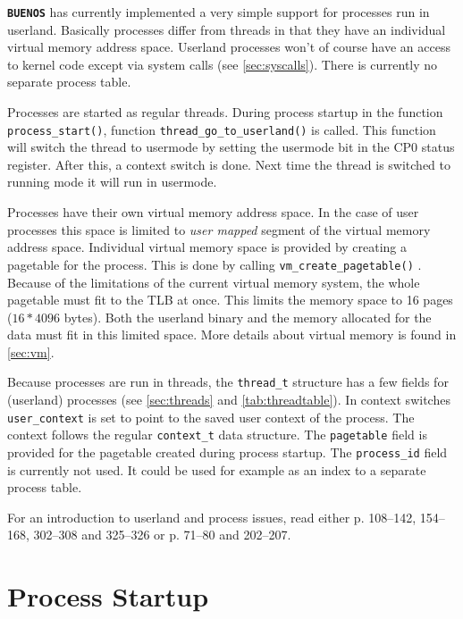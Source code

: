 \documentclass[twoside,a4paper]{report}
\newcommand{\buenos}{\texttt{\textbf{BUENOS}}}
\begin{document}
\buenos{} has currently implemented a very simple support for
processes run in userland. Basically processes differ from threads in
that they have an individual virtual memory address space. Userland
processes won't of course have an access to kernel code except via
system calls (see \autoref{sec:syscalls}). There is currently no
separate process table.

Processes are started as regular threads. During process startup in
the function \texttt{process\_start()}, function
\texttt{thread\_go\_to\_userland()} is called. This function will
switch the thread to usermode by setting the usermode bit in the CP0
status register. After this, a context switch is done. Next time the
thread is switched to running mode it will run in usermode.

Processes have their own virtual memory address space. In the case of
user processes this space is limited to \emph{user mapped} segment of
the virtual memory address space. Individual virtual memory space is
provided by creating a pagetable for the process. This is done by
calling \texttt{vm\_create\_pagetable()}
. Because
of the limitations of the current virtual memory system, the whole
pagetable must fit to the TLB at once. This limits the memory space to
16 pages ($16 * 4096$ bytes). Both the userland binary and the memory
allocated for the data must fit in this limited space. More details
about virtual memory is found in \autoref{sec:vm}.

 
Because processes are run in threads, the \texttt{thread\_t}
 structure has a few fields for
(userland) processes (see \autoref{sec:threads} and
\autoref{tab:threadtable}). In context switches \texttt{user\_context}
 is set to point to the
saved user context of the process. The context follows the regular
\texttt{context\_t}  data
structure. The \texttt{pagetable} field is provided for the pagetable
created during process startup. The \texttt{process\_id} field is
currently not used. It could be used for example as an index to a
separate process table.

For an introduction to userland and process issues, read either
\cite{stallings} p. 108--142, 154--168, 302--308 and 325--326 or
\cite{tanenbaum} p. 71--80 and 202--207.

\section{Process Startup}
\end{document}
